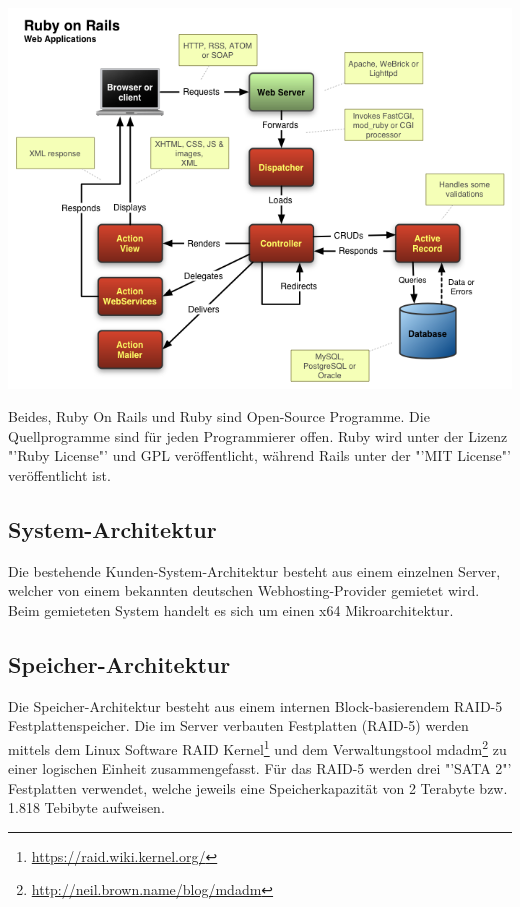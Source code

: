 \begin{center}
\includegraphics[width=\linewidth, keepaspectratio = true]{media/rails-architecture.png}
\end{center}

Beides, Ruby On Rails und Ruby sind Open-Source Programme. Die Quellprogramme sind für jeden Programmierer offen. Ruby wird unter der Lizenz "'Ruby License"' und GPL veröffentlicht, während Rails unter der "'MIT License"' veröffentlicht ist.

\subsection{System-Architektur}\label{System-Architektur}
Die bestehende Kunden-System-Architektur besteht aus einem einzelnen Server, welcher von einem bekannten deutschen Webhosting-Provider gemietet wird. Beim gemieteten System handelt es sich um einen x64 Mikroarchitektur.

\subsection{Speicher-Architektur}
Die Speicher-Architektur besteht aus einem internen Block-basierendem RAID-5 Festplattenspeicher. Die im Server verbauten Festplatten (RAID-5) werden mittels dem Linux Software RAID Kernel\footnote{\url{https://raid.wiki.kernel.org/}} und dem Verwaltungstool mdadm\footnote{\url{http://neil.brown.name/blog/mdadm}} zu einer logischen Einheit zusammengefasst. Für das RAID-5 werden drei "'SATA 2"' Festplatten verwendet, welche jeweils eine Speicherkapazität von 2 Terabyte bzw. 1.818 Tebibyte aufweisen.

